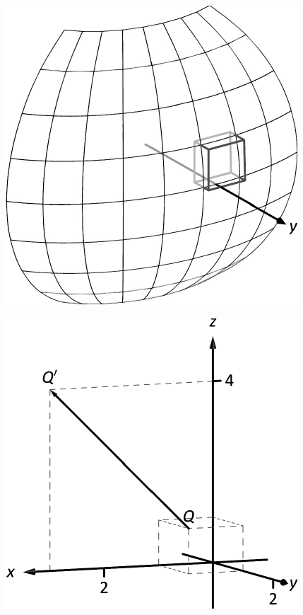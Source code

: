 \documentclass[10pt]{article}
\begin{document}
\includegraphics{figtripintroa_3DBW.pdf}
\texttt{}

\includegraphics{figvectintro3b_3DBW.pdf}
\texttt{}
\end{document}
